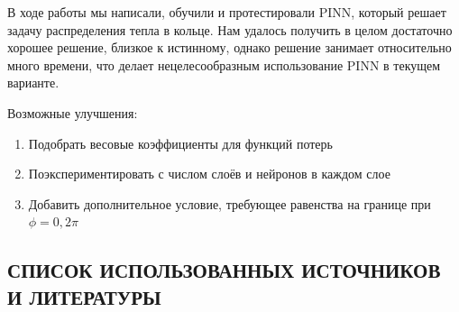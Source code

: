 \documentclass[a4paper,14pt]{extarticle} %
\begin{document}
В ходе работы мы написали, обучили и протестировали PINN, который решает задачу распределения тепла в кольце. Нам удалось получить в целом достаточно хорошее решение, близкое к истинному, однако решение занимает относительно много времени, что делает нецелесообразным использование PINN в текущем варианте. 

Возможные улучшения:

\begin{enumerate}[label={\arabic*)}]
    \item Подобрать весовые коэффициенты для функций потерь
    \item Поэкспериментировать с числом слоёв и нейронов в каждом слое
    \item Добавить дополнительное условие, требующее равенства на границе при $\phi=0, 2\pi$
\end{enumerate}

\newpage
\begin{center} 
\section*{СПИСОК ИСПОЛЬЗОВАННЫХ ИСТОЧНИКОВ И ЛИТЕРАТУРЫ}
\label{sec:intro}
\end{center}
\renewcommand{\refname}{}
\vglue-40pt


\end{document}
